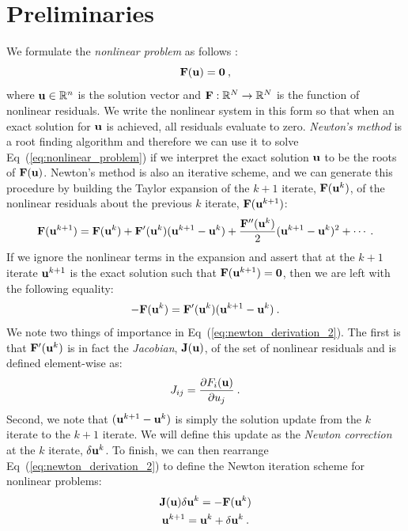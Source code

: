 \section{Preliminaries\ }
\label{sec:nonlinear_preliminaries}
We formulate the \textit{nonlinear problem} as follows
\cite{knoll_jacobian-free_2004}:
\begin{equation}
  \mathbf{F}(\mathbf{u}) = \mathbf{0}\:,
  \label{eq:nonlinear_problem}
\end{equation}
where $\mathbf{u} \in \mathbb{R}^n$ is the solution vector and
$\mathbf{F}:\mathbb{R}^N \rightarrow \mathbb{R}^N$ is the function of
nonlinear residuals. We write the nonlinear system in this form so
that when an exact solution for $\mathbf{u}$ is achieved, all residuals
evaluate to zero. \textit{Newton's method} is a root finding algorithm
and therefore we can use it to solve Eq~(\ref{eq:nonlinear_problem})
if we interpret the exact solution $\mathbf{u}$ to be the roots of
$\mathbf{F}(\mathbf{u})$. Newton's method is also an iterative scheme, and we
can generate this procedure by building the Taylor expansion of the
$k+1$ iterate, $\mathbf{F}(\mathbf{u}^k)$, of the nonlinear residuals about
the previous $k$ iterate, $\mathbf{F}(\mathbf{u}^{k+1})$:
\begin{equation}
  \mathbf{F}(\mathbf{u}^{k+1}) = \mathbf{F}(\mathbf{u}^{k}) +
  \mathbf{F}'(\mathbf{u}^{k})(\mathbf{u}^{k+1}-\mathbf{u}^{k}) +
  \frac{\mathbf{F}''(\mathbf{u}^{k})}{2}(\mathbf{u}^{k+1}-\mathbf{u}^{k})^2 + \cdots
  \:.
  \label{eq:newton_derivation_1}
\end{equation}
If we ignore the nonlinear terms in the expansion and assert that at
the $k+1$ iterate $\mathbf{u}^{k+1}$ is the exact solution such that
$\mathbf{F}(\mathbf{u}^{k+1}) = \mathbf{0}$, then we are left with the following
equality:
\begin{equation}
  -\mathbf{F}(\mathbf{u}^{k}) =
  \mathbf{F}'(\mathbf{u}^{k})(\mathbf{u}^{k+1}-\mathbf{u}^{k})\:.
  \label{eq:newton_derivation_2}
\end{equation}
We note two things of importance in
Eq~(\ref{eq:newton_derivation_2}). The first is that
$\mathbf{F}'(\mathbf{u}^{k})$ is in fact the \textit{Jacobian},
$\mathbf{J}(\mathbf{u})$, of the set of nonlinear residuals and is defined
element-wise as:
\begin{equation}
  J_{ij} = \frac{\partial F_i(\mathbf{u})}{\partial u_j}\:.
  \label{eq:jacobian_def}
\end{equation}
Second, we note that $(\mathbf{u}^{k+1}-\mathbf{u}^{k})$ is simply the
solution update from the $k$ iterate to the $k+1$ iterate. We will
define this update as the \textit{Newton correction} at the $k$
iterate, $\delta \mathbf{u}^k$. To finish, we can then rearrange
Eq~(\ref{eq:newton_derivation_2}) to define the Newton iteration
scheme for nonlinear problems:
\begin{subequations}
  \begin{gather}
    \mathbf{J}(\mathbf{u}) \delta \mathbf{u}^k = -\mathbf{F}(\mathbf{u}^{k})\\
    \mathbf{u}^{k+1} = \mathbf{u}^k + \delta \mathbf{u}^k\:.
  \end{gather}
  \label{eq:newton_iteration}
\end{subequations}

